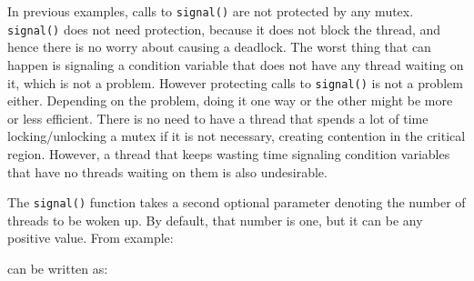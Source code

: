 
In previous examples, calls to \texttt{signal()} are not
protected by any mutex. \texttt{signal()} does not need
protection, because it does not block the thread, and hence there is no
worry about causing a deadlock. The worst thing that can happen is
signaling a condition variable that does not have any thread waiting on
it, which is not a problem. However protecting calls to
\texttt{signal()} is not a problem either. Depending on the
problem, doing it one way or the other might be more or less efficient.
There is no need to have a thread that spends a lot of time
locking/unlocking a mutex if it is not necessary, creating contention
in the critical region. However, a thread that keeps wasting time
signaling condition variables that have no threads waiting on them is
also undesirable.

The \texttt{signal()} function takes a second optional
parameter denoting the number of threads to be woken up. By default,
that number is one, but it can be any positive value. From example:


can be written as:

